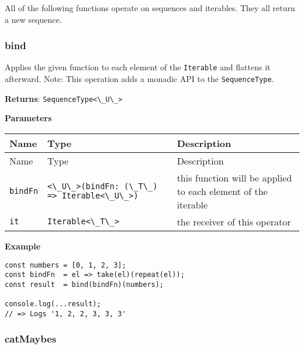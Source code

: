 All of the following functions operate on sequences and iterables. They
all return a new sequence.

\hypertarget{ac6d2b03-9c43-4e0e-8308-92102a526003}{%
\subsubsection{bind}\label{ac6d2b03-9c43-4e0e-8308-92102a526003}}

Applies the given function to each element of the
\passthrough{\lstinline!Iterable!} and flattens it afterward. Note: This
operation adds a monadic API to the
\passthrough{\lstinline!SequenceType!}.

\textbf{Returns}: \passthrough{\lstinline!SequenceType<\_U\_>!}

\textbf{Parameters}

\begin{longtable}[]{
  >{\raggedright\arraybackslash}p{}
  >{\raggedright\arraybackslash}p{}
  >{\raggedright\arraybackslash}p{}@{}}
\toprule\noalign{}
Name & Type & Description \\
\midrule\noalign{}
\endfirsthead
\toprule\noalign{}
Name & Type & Description \\
\midrule\noalign{}
\endhead
\bottomrule\noalign{}
\endlastfoot
\passthrough{\lstinline!bindFn!} &
\passthrough{\lstinline!<\_U\_>(bindFn: (\_T\_) => Iterable<\_U\_>)!} &
this function will be applied to each element of the iterable \\
\passthrough{\lstinline!it!} & \passthrough{\lstinline!Iterable<\_T\_>!}
& the receiver of this operator \\
\end{longtable}

\textbf{Example}

\begin{lstlisting}[label=88beac1a-9eb8-42b2-b315-c2e69ef8bdbf]
const numbers = [0, 1, 2, 3];
const bindFn  = el => take(el)(repeat(el));
const result  = bind(bindFn)(numbers);
                                           
console.log(...result);
// => Logs '1, 2, 2, 3, 3, 3'
\end{lstlisting}

\hypertarget{341a8910-fef6-491a-ad04-e13dbd302b95}{%
\subsubsection{catMaybes}\label{341a8910-fef6-491a-ad04-e13dbd302b95}}

